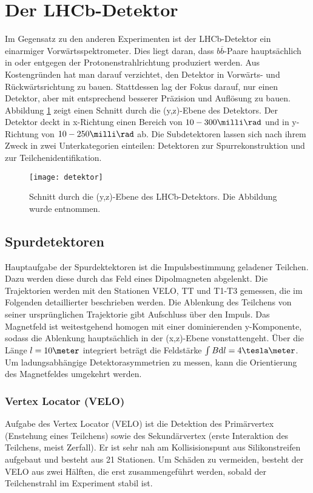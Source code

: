 \section{Der LHCb-Detektor}
Im Gegensatz zu den anderen Experimenten ist der LHCb-Detektor ein einarmiger Vorwärtsspektrometer. Dies liegt daran, dass $b\overline{b}$-Paare hauptsächlich in oder entgegen der Protonenstrahlrichtung produziert werden. Aus Kostengründen hat man darauf verzichtet, den Detektor in Vorwärts- und Rückwärtsrichtung zu bauen. Stattdessen lag der Fokus darauf, nur einen Detektor, aber mit entsprechend besserer Präzision und Auflösung zu bauen. Abbildung \ref{fig:detektor} zeigt einen Schnitt durch die (y,z)-Ebene des Detektors. Der Detektor deckt in x-Richtung einen Bereich von $10-300\milli\rad$ und in y-Richtung von $10-250\milli\rad$ ab. Die Subdetektoren lassen sich nach ihrem Zweck in zwei Unterkategorien einteilen: Detektoren zur Spurrekonstruktion und zur Teilchenidentifikation.

\begin{figure}[hptb]
\centering
\texttt{[image: detektor]}
\caption{Schnitt durch die (y,z)-Ebene des LHCb-Detektors. Die Abbildung wurde \cite{detector} entnommen.}
\label{fig:detektor}
\end{figure}


\subsection{Spurdetektoren}
Hauptaufgabe der Spurdektektoren ist die Impulsbestimmung geladener Teilchen. Dazu werden diese durch das Feld eines Dipolmagneten abgelenkt. Die Trajektorien werden mit den Stationen VELO, TT und T1-T3 gemessen, die im Folgenden detaillierter beschrieben werden. Die Ablenkung des Teilchens von seiner ursprünglichen Trajektorie gibt Aufschluss über den Impuls. Das Magnetfeld ist weitestgehend homogen mit einer dominierenden y-Komponente, sodass die Ablenkung hauptsächlich in der (x,z)-Ebene vonstattengeht. Über die Länge $l=10\meter$ integriert beträgt die Feldstärke $\int B\mathrm{d}l = 4\tesla\meter$. Um ladungsabhängige Detektorasymmetrien zu messen, kann die Orientierung des Magnetfeldes umgekehrt werden. \cite{thesis_linn}

\subsubsection{Vertex Locator (VELO)}
Aufgabe des Vertex Locator (VELO) ist die Detektion des Primärvertex (Enstehung eines Teilchens) sowie des Sekundärvertex (erste Interaktion des Teilchens, meist Zerfall). Er ist sehr nah am Kollisisionspunt aus Silikonstreifen aufgebaut und besteht aus 21 Stationen. Um Schäden zu vermeiden, besteht der VELO aus zwei Hälften, die erst zusammengeführt werden, sobald der Teilchenstrahl im Experiment stabil ist.

